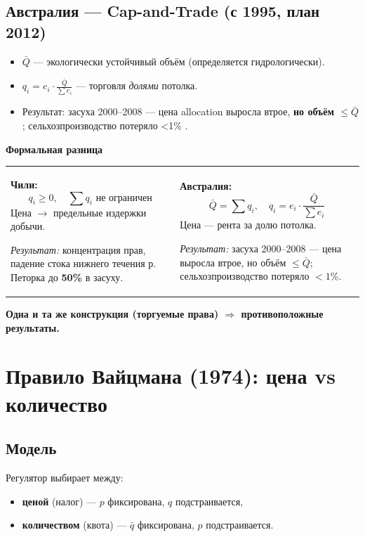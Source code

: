 \documentclass[12pt]{article}
\begin{document}
\subsection{Австралия — Cap-and-Trade (с 1995, план 2012)}
\begin{itemize}
\item $\bar{Q}$ — экологически устойчивый объём (определяется гидрологически).
\item $q_i = e_i \cdot \frac{\bar{Q}}{\sum e_i}$ — торговля \emph{долями} потолка.
\item Результат: засуха 2000–2008 — цена allocation выросла втрое, \textbf{но объём $\le \bar{Q}$}; сельхозпроизводство потеряло <1\% \cite{grafton2012water}.
\end{itemize}

\textbf{Формальная разница}

\vspace{0.3cm} %

\begin{tabular}{p{} p{}}
\textbf{Чили:}
$$q_i \ge 0,\quad \sum q_i \text{ не ограничен}$$
Цена $\to$ предельные издержки добычи.

\vspace{0.2cm} %

\textit{Результат:} концентрация прав, падение стока нижнего течения р. Петорка до \textbf{50\%} в засуху.
&
\textbf{Австралия:}
$$\bar{Q} = \sum q_i,\quad q_i = e_i \cdot \frac{\bar{Q}}{\sum e_i}$$
Цена — рента за долю потолка.

\vspace{0.2cm}

\textit{Результат:} засуха 2000–2008 — цена выросла втрое, но объём $\le \bar{Q}$; сельхозпроизводство потеряло $<1$\%.
\end{tabular}

\textbf{Одна и та же конструкция (торгуемые права) $\Rightarrow$ противоположные результаты.}

\section{Правило Вайцмана (1974): цена vs количество}

\subsection{Модель}
Регулятор выбирает между:
\begin{itemize}
\item \textbf{ценой} (налог) — $p$ фиксирована, $q$ подстраивается,
\item \textbf{количеством} (квота) — $\bar{q}$ фиксирована, $p$ подстраивается.
\end{itemize}
\end{document}

